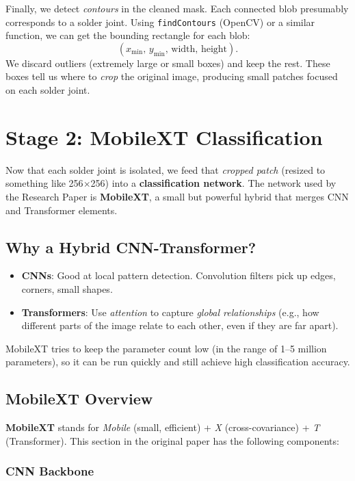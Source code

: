 \documentclass{article}
\begin{document}
Finally, we detect \emph{contours} in the cleaned mask. 
Each connected blob presumably corresponds to a solder joint. 
Using \texttt{findContours} (OpenCV) or a similar function, we can get the bounding rectangle for each blob:
\[
   (x_{\min},\,y_{\min},\,\text{width},\,\text{height}).
\]
We discard outliers (extremely large or small boxes) and keep the rest. 
These boxes tell us where to \emph{crop} the original image, producing small patches focused on each solder joint.

\section{Stage 2: MobileXT Classification }

Now that each solder joint is isolated, we feed that \emph{cropped patch} (resized to something like 256$\times$256) into a \textbf{classification network}. 
The network used by the Research Paper is \textbf{MobileXT}, a small but powerful hybrid that merges CNN and Transformer elements.

\subsection{Why a Hybrid CNN-Transformer? }

\begin{itemize}
    \item \textbf{CNNs}: Good at local pattern detection. Convolution filters pick up edges, corners, small shapes.
    \item \textbf{Transformers}: Use \emph{attention} to capture \emph{global relationships} (e.g., how different parts of the image relate to each other, even if they are far apart).
\end{itemize}

MobileXT tries to keep the parameter count low (in the range of 1--5 million parameters), 
so it can be run quickly and still achieve high classification accuracy.

\subsection{MobileXT Overview}

\textbf{MobileXT} stands for \textit{Mobile} (small, efficient) + \textit{X} (cross-covariance) + \textit{T} (Transformer). 
This section in the original paper has the following components:

\subsubsection{CNN Backbone}
\end{document}
